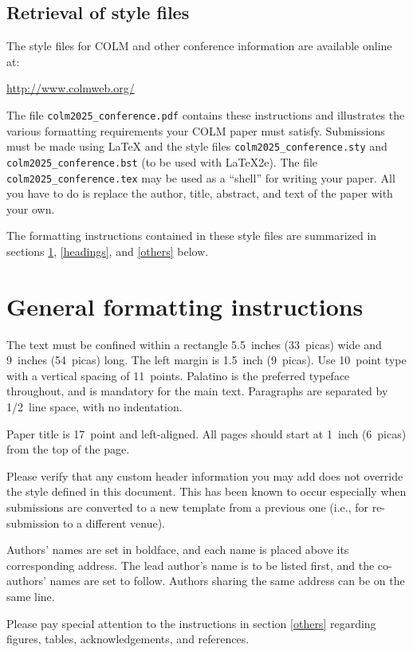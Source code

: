\documentclass{article} %
\begin{document}
\subsection{Retrieval of style files}

The style files for COLM and other conference information are available online at:
\begin{center}
   \url{http://www.colmweb.org/}
\end{center}
The file \verb+colm2025_conference.pdf+ contains these
instructions and illustrates the
various formatting requirements your COLM paper must satisfy.
Submissions must be made using \LaTeX{} and the style files
\verb+colm2025_conference.sty+ and \verb+colm2025_conference.bst+ (to be used with \LaTeX{}2e). The file
\verb+colm2025_conference.tex+ may be used as a ``shell'' for writing your paper. All you
have to do is replace the author, title, abstract, and text of the paper with
your own.

The formatting instructions contained in these style files are summarized in
sections \ref{gen_inst}, \ref{headings}, and \ref{others} below.

\section{General formatting instructions}
\label{gen_inst}

The text must be confined within a rectangle 5.5~inches (33~picas) wide and
9~inches (54~picas) long. The left margin is 1.5~inch (9~picas).
Use 10~point type with a vertical spacing of 11~points. Palatino is the
preferred typeface throughout, and is mandatory for the main text. Paragraphs are separated by 1/2~line space, with no indentation.

Paper title is 17~point and left-aligned.
All pages should start at 1~inch (6~picas) from the top of the page.

Please verify that any custom header information you may add does not override the style defined in this document. This has been known to occur especially when submissions are converted to a new template from a previous one (i.e., for re-submission to a different venue).

Authors' names are
set in boldface, and each name is placed above its corresponding
address. The lead author's name is to be listed first, and
the co-authors' names are set to follow. Authors sharing the
same address can be on the same line.

Please pay special attention to the instructions in section \ref{others}
regarding figures, tables, acknowledgements, and references.
\end{document}

